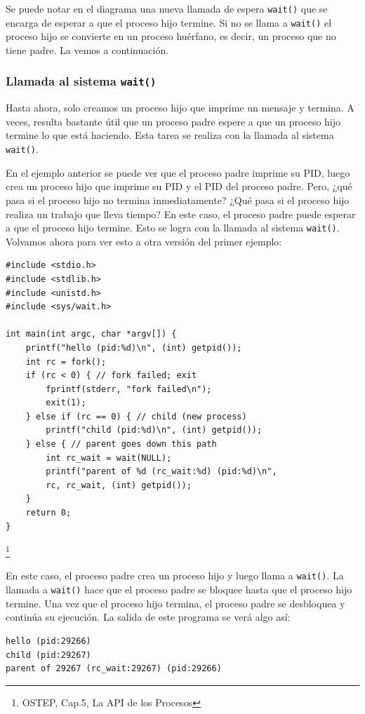\documentclass{article}
\begin{document}
Se puede notar en el diagrama una nueva llamada de espera \texttt{wait()} que se encarga de esperar a que el proceso hijo termine. Si no se llama a \texttt{wait()} el proceso hijo se convierte en un proceso huérfano, es decir, un proceso que no tiene padre. La vemos a continuación.

\subsubsection{Llamada al sistema \texttt{wait()}}
Hasta ahora, solo creamos un proceso hijo que imprime un mensaje y termina. A veces, resulta bastante útil que un proceso padre espere a que un proceso hijo termine lo que está haciendo. Esta tarea se realiza con la llamada al sistema \texttt{wait()}.

En el ejemplo anterior se puede ver que el proceso padre imprime su PID, luego crea un proceso hijo que imprime su PID y el PID del proceso padre. Pero, ¿qué pasa si el proceso hijo no termina inmediatamente? ¿Qué pasa si el proceso hijo realiza un trabajo que lleva tiempo? En este caso, el proceso padre puede esperar a que el proceso hijo termine. Esto se logra con la llamada al sistema \texttt{wait()}. Volvamos ahora para ver esto a otra versión del primer ejemplo:

\begin{verbatim}
#include <stdio.h>
#include <stdlib.h>
#include <unistd.h>
#include <sys/wait.h>

int main(int argc, char *argv[]) {
    printf("hello (pid:%d)\n", (int) getpid());
    int rc = fork();
    if (rc < 0) { // fork failed; exit
        fprintf(stderr, "fork failed\n");
        exit(1);
    } else if (rc == 0) { // child (new process)
        printf("child (pid:%d)\n", (int) getpid());
    } else { // parent goes down this path
        int rc_wait = wait(NULL);
        printf("parent of %d (rc_wait:%d) (pid:%d)\n",
        rc, rc_wait, (int) getpid());
    }
    return 0;
}
\end{verbatim}

\footnote{OSTEP, Cap.5, La API de los Procesos}

En este caso, el proceso padre crea un proceso hijo y luego llama a \texttt{wait()}. La llamada a \texttt{wait()} hace que el proceso padre se bloquee hasta que el proceso hijo termine. Una vez que el proceso hijo termina, el proceso padre se desbloquea y continúa su ejecución. La salida de este programa se verá algo así:

\begin{verbatim}
hello (pid:29266)
child (pid:29267)
parent of 29267 (rc_wait:29267) (pid:29266)
\end{verbatim}
\end{document}
